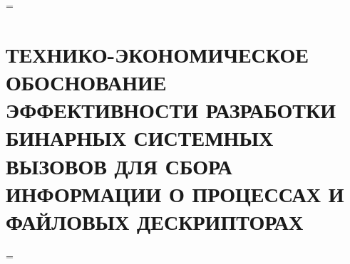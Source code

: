 \newcommand{\rub}{руб}

\newdimen\origiwstr
\origiwstr=\font
{}\origiwstr
\section{ТЕХНИКО-ЭКОНОМИЧЕСКОЕ ОБОСНОВАНИЕ ЭФФЕКТИВНОСТИ РАЗРАБОТКИ БИНАРНЫХ
  СИСТЕМНЫХ ВЫЗОВОВ ДЛЯ СБОРА ИНФОРМАЦИИ О ПРОЦЕССАХ И ФАЙЛОВЫХ ДЕСКРИПТОРАХ}
\font=\origiwstr
















